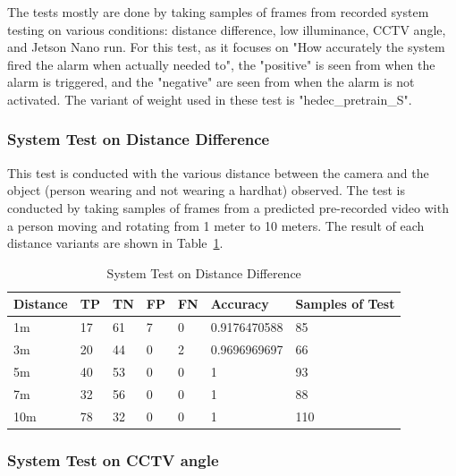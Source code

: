 \par The tests mostly are done by taking samples of frames from recorded system testing on various conditions: distance difference, low illuminance, CCTV angle, and Jetson Nano run. For this test, as it focuses on "How accurately the system fired the alarm when actually needed to", the "positive" is seen from when the alarm is triggered, and the "negative" are seen from when the alarm is not activated. The variant of weight used in these test is "hedec\_pretrain\_S".

\subsubsection{System Test on Distance Difference}
\label{subsubsec:hedect_test_dist}

\par This test is conducted with the various distance between the camera and the object (person wearing and not wearing a hardhat) observed. The test is conducted by taking samples of frames from a predicted pre-recorded video with a person moving and rotating from 1 meter to 10 meters. The result of each distance variants are shown in Table~\ref{tb:systest_dist_test}.

\begin{table}
  \centering
  \caption{System Test on Distance Difference}
  \label{tb:systest_dist_test}
  \begin{tabular}{|l|l|l|l|l|l|l|} 
  \hline
  Distance & TP & TN & FP & FN & Accuracy     & Samples of Test  \\ 
  \hline
  1m       & 17 & 61 & 7  & 0  & 0.9176470588 & 85               \\ 
  \hline
  3m       & 20 & 44 & 0  & 2  & 0.9696969697 & 66               \\ 
  \hline
  5m       & 40 & 53 & 0  & 0  & 1            & 93               \\ 
  \hline
  7m       & 32 & 56 & 0  & 0  & 1            & 88               \\ 
  \hline
  10m      & 78 & 32 & 0  & 0  & 1            & 110              \\
  \hline
  \end{tabular}
\end{table}


\subsubsection{System Test on CCTV angle}
\label{subsubsec:hedect_test_cctv}

